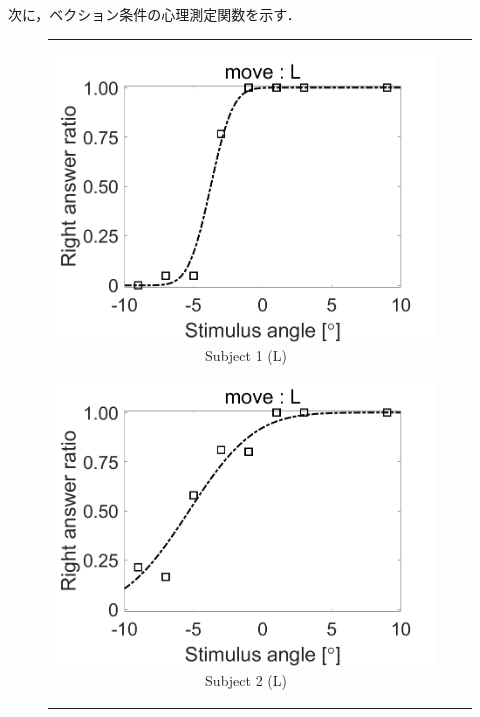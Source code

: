 \documentclass[12pt,a4j]{jsarticle}
\renewcommand{\ }{\hspace{1zw}}
\begin{document}
\raggedright
次に，ベクション条件の心理測定関数を示す．
\begin{figure}[htbp]
    \centering
    \begin{tabular}{ccc}
        \begin{minipage}{0.33\columnwidth}
            \centering
            \includegraphics[width=\columnwidth]{./figure/L_maeda.png}
            Subject 1 (L)
        \end{minipage}
        \begin{minipage}{0.33\columnwidth}
            \centering
            \includegraphics[width=\columnwidth]{./figure/L_niitsuma.png}
            Subject 2 (L)
        \end{minipage}
        \begin{minipage}{0.33\columnwidth}

\end{minipage}
\end{tabular}
\end{figure}
\end{document}
